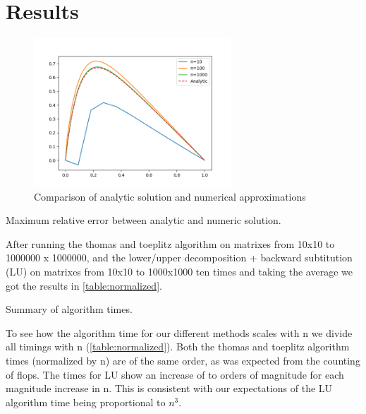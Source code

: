 \section*{Results}

\begin{figure}[H]
  \centering
  \includegraphics[width=0.66\textwidth]{../figures/thomas.png}
  \caption{Comparison of analytic solution and numerical approximations}
  \label{fig:a}
\end{figure}


\begin{table}[htp]
  \centering
  \caption{Maximum relative error between analytic and numeric solution.}
  \label{table:relative_error}
\end{table}



After running the thomas and toeplitz algorithm on matrixes from 10x10 to
1000000 x 1000000, and the lower/upper decomposition + backward subtitution (LU)
on matrixes from 10x10 to 1000x1000 ten times and taking the average we got the
results in \cref{table:normalized}.

\begin{table}[htp]
  \centering
  \caption{Summary of algorithm times.}
  \label{table:normalized}
\end{table}


To see how the algorithm time for our different methods scales with n we divide
all timings with n (\cref{table:normalized}). Both the thomas and toeplitz
algorithm times (normalized by n) are of the same order, as was expected from
the counting of flops. The times for LU show an increase of to orders of magnitude
for each magnitude increase in n. This is consistent with our expectations
of the LU algorithm time being proportional to $n^3$.

